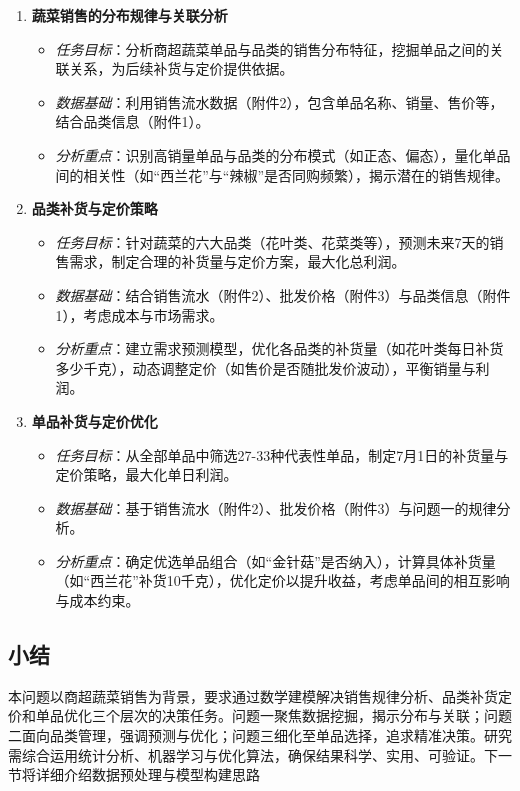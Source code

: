 \documentclass{cumcmthesis} %
\begin{document}
\begin{enumerate}
\item \textbf{蔬菜销售的分布规律与关联分析}
\begin{itemize}
\item \textit{任务目标}：分析商超蔬菜单品与品类的销售分布特征，挖掘单品之间的关联关系，为后续补货与定价提供依据。
\item \textit{数据基础}：利用销售流水数据（附件2），包含单品名称、销量、售价等，结合品类信息（附件1）。
\item \textit{分析重点}：识别高销量单品与品类的分布模式（如正态、偏态），量化单品间的相关性（如“西兰花”与“辣椒”是否同购频繁），揭示潜在的销售规律。
\end{itemize}

\item \textbf{品类补货与定价策略}
\begin{itemize}
\item \textit{任务目标}：针对蔬菜的六大品类（花叶类、花菜类等），预测未来7天的销售需求，制定合理的补货量与定价方案，最大化总利润。
\item \textit{数据基础}：结合销售流水（附件2）、批发价格（附件3）与品类信息（附件1），考虑成本与市场需求。
\item \textit{分析重点}：建立需求预测模型，优化各品类的补货量（如花叶类每日补货多少千克），动态调整定价（如售价是否随批发价波动），平衡销量与利润。
\end{itemize}

\item \textbf{单品补货与定价优化}
\begin{itemize}
\item \textit{任务目标}：从全部单品中筛选27-33种代表性单品，制定7月1日的补货量与定价策略，最大化单日利润。
\item \textit{数据基础}：基于销售流水（附件2）、批发价格（附件3）与问题一的规律分析。
\item \textit{分析重点}：确定优选单品组合（如“金针菇”是否纳入），计算具体补货量（如“西兰花”补货10千克），优化定价以提升收益，考虑单品间的相互影响与成本约束。
\end{itemize}
\end{enumerate}

\subsection{小结}

本问题以商超蔬菜销售为背景，要求通过数学建模解决销售规律分析、品类补货定价和单品优化三个层次的决策任务。问题一聚焦数据挖掘，揭示分布与关联；问题二面向品类管理，强调预测与优化；问题三细化至单品选择，追求精准决策。研究需综合运用统计分析、机器学习与优化算法，确保结果科学、实用、可验证。下一节将详细介绍数据预处理与模型构建思路
\end{document}
